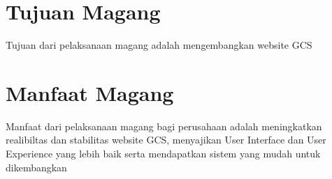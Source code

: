 \section{Tujuan Magang}
Tujuan dari pelaksanaan magang adalah mengembangkan website GCS

\section{Manfaat Magang}
Manfaat dari pelaksanaan magang bagi perusahaan adalah meningkatkan realibiltas dan stabilitas website GCS, menyajikan User Interface dan User Experience yang lebih baik serta mendapatkan sistem yang mudah untuk dikembangkan
